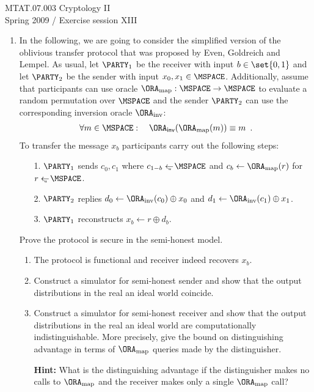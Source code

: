 \documentclass{article}
\begin{document}
\noindent	
MTAT.07.003 Cryptology II\\
Spring 2009 / Exercise session XIII


\begin{enumerate}

\item In the following, we are going to consider the simplified
  version of the oblivious transfer protocol that was proposed by
  Even, Goldreich and Lempel. As usual, let $\PARTY_1$ be the receiver
  with input $b\in\set{0,1}$ and let $\PARTY_2$ be the sender with
  input $x_0,x_1\in\MSPACE$. Additionally, assume that participants
  can use oracle $\ORA_{\mathrm{map}}:\MSPACE\to\MSPACE$ to evaluate a
  random permutation over $\MSPACE$ and the sender $\PARTY_2$ can use
  the corresponding inversion oracle $\ORA_{\mathrm{inv}}$:
  \begin{align*}
    \forall m\in\MSPACE:\quad
    \ORA_{\mathsf{inv}}(\ORA_{\mathrm{map}}(m))\equiv m\enspace.
  \end{align*}
  To transfer the message $x_b$ participants carry out the following
  steps:
  \begin{enumerate}
  \item[1.] $\PARTY_1$ sends $c_0,c_1$ where $c_{1-b}\getsu\MSPACE$ and
    $c_{b}\gets \ORA_{\mathrm{map}}(r)$ for $r\getsu\MSPACE$.
  \item[2.] $\PARTY_2$ replies $d_0\gets\ORA_{\mathrm{inv}}(c_0)\oplus
    x_0$ and $d_1\gets\ORA_{\mathrm{inv}}(c_1)\oplus x_1$.
  \item[3.] $\PARTY_1$ reconstructs $x_b\gets r\oplus d_b$.
  \end{enumerate}
  Prove the protocol is secure in the semi-honest model.
  \begin{enumerate}
  \item The protocol is functional and receiver indeed recovers $x_b$. 
  \item Construct a simulator for semi-honest sender and show
    that the output distributions in the real an ideal world coincide.
  \item Construct a simulator for semi-honest receiver and show that
    the output distributions in the real an ideal world are
    computationally indistinguishable. More precisely, give the bound
    on distinguishing advantage in terms of $\ORA_{\mathrm{map}}$
    queries made by the distinguisher.

    \textbf{Hint:} What is the distinguishing advantage if the
    distinguisher makes no calls to $\ORA_{\mathrm{map}}$ and the
    receiver makes only a single $\ORA_{\mathrm{map}}$ call?
  \end{enumerate}


\end{enumerate}
\end{document}
